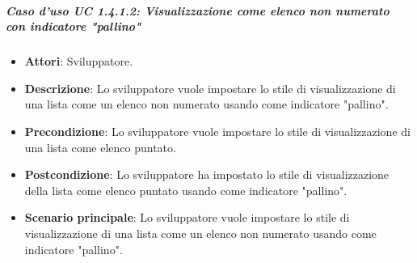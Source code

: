 \subparagraph{Caso d'uso UC 1.4.1.2: Visualizzazione come elenco non numerato con indicatore "pallino"}

\FloatBarrier
\begin{itemize}
\item\textbf{Attori}: Sviluppatore.
\item\textbf{Descrizione}: Lo sviluppatore vuole impostare lo stile di visualizzazione di una lista come un elenco non numerato usando come indicatore "pallino".
\item\textbf{Precondizione}: Lo sviluppatore vuole impostare lo stile di visualizzazione di una lista come elenco puntato.
\item\textbf{Postcondizione}: Lo sviluppatore ha impostato lo stile di visualizzazione della lista come elenco puntato usando come indicatore "pallino".
\item\textbf{Scenario principale}: Lo sviluppatore vuole impostare lo stile di visualizzazione di una lista come un elenco non numerato usando come indicatore "pallino".
\end{itemize}

